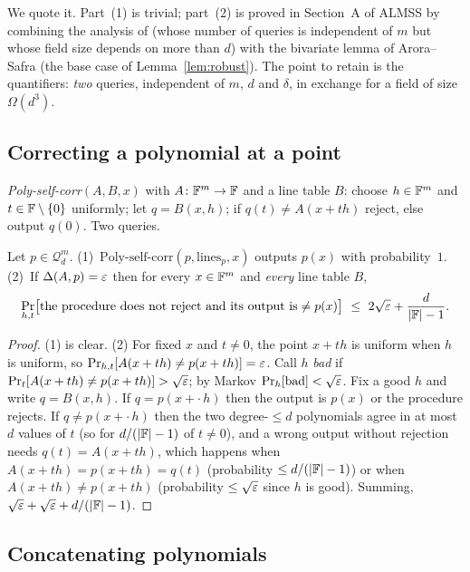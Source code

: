 \noindent
We quote it.  Part~(1) is trivial; part~(2) is proved in Section~A of ALMSS by combining the analysis of \citet{RubinfeldSudan96} (whose number of queries is independent of $m$ but whose field size depends on more than $d$) with the bivariate lemma of Arora--Safra (the base case of Lemma~\ref{lem:robust}).
The point to retain is the quantifiers: \emph{two} queries, independent of $m$, $d$ and $\delta$, in exchange for a field of size $\Omega(d^3)$.

\subsection{Correcting a polynomial at a point}

\begin{definition}\label{def:polycorr}
\emph{Poly-self-corr}$(A,B,x)$ with $A\colon\mathbb{F}^m\to\mathbb{F}$ and a line table $B$: choose $h\in\mathbb{F}^m$ and $t\in\mathbb{F}\setminus\{0\}$ uniformly; let $q=B(x,h)$; if $q(t)\ne A(x+th)$ reject, else output $q(0)$.  Two queries.
\end{definition}

\begin{proposition}\label{prop:polycorr}
Let $p\in\mathcal Q^m_d$.  (1)~$\mathrm{Poly\text{-}self\text{-}corr}(p,\mathrm{lines}_p,x)$ outputs $p(x)$ with probability~$1$.  (2)~If $\Delta(A,p)=\varepsilon$ then for every $x\in\mathbb{F}^m$ and \emph{every} line table $B$,
\[
  \Pr_{h,t}\bigl[\text{the procedure does not reject and its output is}\ne p(x)\bigr]\ \le\ 2\sqrt{\varepsilon}+\frac d{|\mathbb{F}|-1}.
\]
\end{proposition}
\begin{proof}
(1) is clear.  (2) For fixed $x$ and $t\ne0$, the point $x+th$ is uniform when $h$ is uniform, so $\Pr_{h,t}[A(x+th)\ne p(x+th)]=\varepsilon$.  Call $h$ \emph{bad} if $\Pr_t[A(x+th)\ne p(x+th)]>\sqrt{\varepsilon}$; by Markov $\Pr_h[\text{bad}]<\sqrt{\varepsilon}$.
Fix a good $h$ and write $q=B(x,h)$.  If $q=p(x+\cdot\,h)$ then the output is $p(x)$ or the procedure rejects.  If $q\ne p(x+\cdot\,h)$ then the two degree-$\le d$ polynomials agree in at most $d$ values of $t$ (so for $d/(|\mathbb{F}|-1)$ of $t\ne0$), and a wrong output
without rejection needs $q(t)=A(x+th)$, which happens when $A(x+th)=p(x+th)=q(t)$ (probability $\le d/(|\mathbb{F}|-1)$) or when $A(x+th)\ne p(x+th)$ (probability $\le\sqrt{\varepsilon}$ since $h$ is good).  Summing, $\sqrt{\varepsilon}+\sqrt{\varepsilon}+d/(|\mathbb{F}|-1)$.
\end{proof}

\subsection{Concatenating polynomials}


